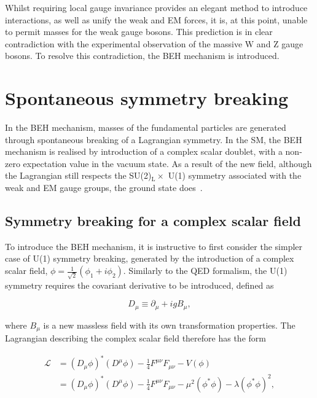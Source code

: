 Whilst requiring local gauge invariance provides an elegant method to introduce interactions, as well as unify the weak and EM forces, it is, at this point, unable to permit masses for the weak gauge bosons. This prediction is in clear contradiction with the experimental observation of the massive $\mathrm{W}$ and $\mathrm{Z}$ gauge bosons. To resolve this contradiction, the BEH mechanism is introduced.

\section{Spontaneous symmetry breaking}

In the BEH mechanism, masses of the fundamental particles are generated through spontaneous breaking of a Lagrangian symmetry. In the SM, the BEH mechanism is realised by introduction of a complex scalar doublet, with a non-zero expectation value in the vacuum state. As a result of the new field, although the Lagrangian still respects the SU(2)$_{\mathrm{L}}\times$ U(1) symmetry associated with the weak and EM gauge groups, the ground state does~\cite{BroutEnglert,HiggsBS1,HiggsBS2,HiggsBS3,Kibble}.


\subsection{Symmetry breaking for a complex scalar field}

To introduce the BEH mechanism, it is instructive to first consider the simpler case of U(1) symmetry breaking, generated by the introduction of a complex scalar field, $\phi=\frac{1}{\sqrt{2}}(\phi_{1} + i\phi_{2})$. Similarly to the QED formalism, the U(1) symmetry requires the covariant derivative to be introduced, defined as~\cite{Thomson}

\begin{equation}
    D_{\mu} \equiv \partial_{\mu} + igB_{\mu},
\end{equation}

\noindent where $B_{\mu}$ is a new massless field with its own transformation properties. The Lagrangian describing the complex scalar field therefore has the form~\cite{Thomson}

\begin{align}
\label{eqn:complex_scalar_lagrangian}
    \mathcal{L} &= (D_{\mu}\phi)^{*}(D^{\mu}\phi) -\frac{1}{4}F^{\mu\nu}F_{\mu\nu} - V(\phi) \nonumber \\
    &= (D_{\mu}\phi)^{*}(D^{\mu}\phi) -\frac{1}{4}F^{\mu\nu}F_{\mu\nu} - \mu^{2}(\phi^{*}\phi) - \lambda(\phi^{*}\phi)^{2},
\end{align}

